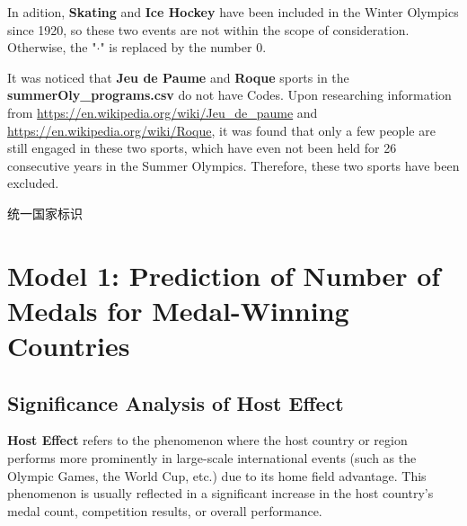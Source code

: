 \documentclass{mcmthesis}
\begin{document}
In adition, \textbf{Skating} and \textbf{Ice Hockey} have been included in the Winter Olympics since 1920, so these two events are not within the scope of consideration. Otherwise, the "$\cdot$" is replaced by the number $0$. 

It was noticed that \textbf{Jeu de Paume} and \textbf{Roque} sports in the {\bf summerOly\_programs.csv} do not have Codes. Upon researching information from {\color{blue}\url{https://en.wikipedia.org/wiki/Jeu_de_paume}} and {\color{blue}\url{https://en.wikipedia.org/wiki/Roque}}, it was found that only a few people are still engaged in these two sports, which have even not been held for 26 consecutive years in the Summer Olympics. Therefore, these two sports have been excluded.



统一国家标识













\section{Model 1: Prediction of Number of Medals for Medal-Winning Countries}

\subsection{Significance Analysis of Host Effect}

\textbf{Host Effect} refers to the phenomenon where the host country or region performs more prominently in large-scale international events (such as the Olympic Games, the World Cup, etc.) due to its home field advantage. This phenomenon is usually reflected in a significant increase in the host country's medal count, competition results, or overall performance. 

\end{document}
